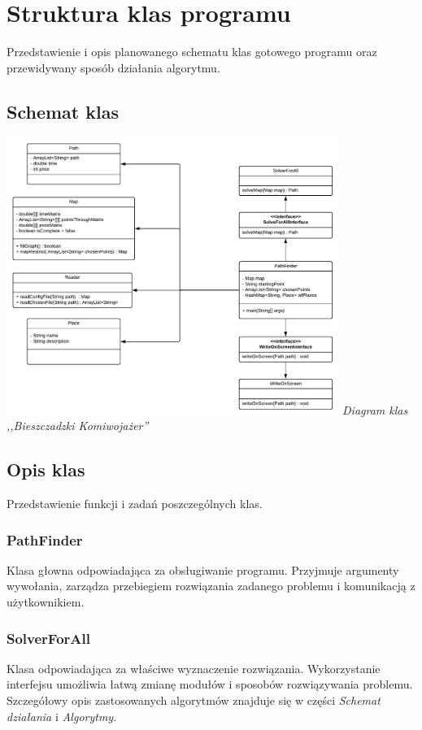 \documentclass{article}
\begin{document}
\section{Struktura klas programu}
Przedstawienie i opis planowanego schematu klas gotowego programu oraz przewidywany sposób działania algorytmu.

\subsection{Schemat klas}
\includegraphics [height=9cm]{diagram_klas.pdf} \newline
\textit{Diagram klas ,,Bieszczadzki Komiwojażer''}

\subsection{Opis klas}
Przedstawienie funkcji i zadań poszczególnych klas.

\subsubsection{PathFinder}
Klasa głowna odpowiadająca za obsługiwanie programu. Przyjmuje argumenty wywołania, zarządza przebiegiem rozwiązania zadanego problemu i komunikacją z użytkownikiem.

\subsubsection{SolverForAll}
Klasa odpowiadająca za właściwe wyznaczenie rozwiązania. Wykorzystanie interfejsu umożliwia łatwą zmianę modułów i sposobów rozwiązywania problemu. Szczegółowy opis zastosowanych algorytmów znajduje się w części \textit{Schemat działania} i \textit{Algorytmy}.
\end{document}
